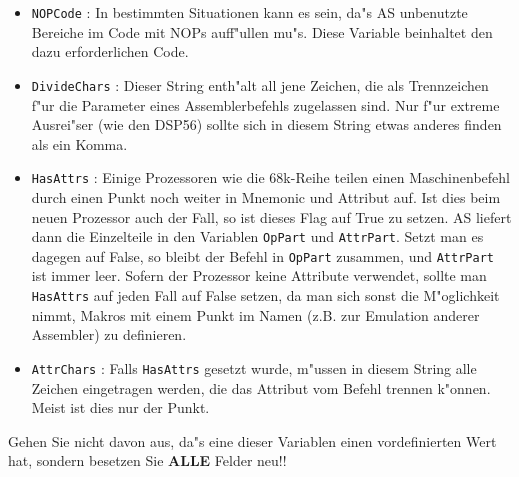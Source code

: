 \documentclass[12pt,a4paper,twoside]{report}
\newcommand{\bb}[1]{{\bf #1}}
\newcommand{\tty}[1]{{\tt #1}}
\begin{document}
{\begin{itemize}
{      diese sind f"ur Sonderzwecke (wie z.B. eine zuk"unftige Erweiterung
      um einen Linker) reserviert.  Auch wenn dieser Wert in den meisten 
      "alteren Codegeneratoren hart gesetzt wird, ist es die heute
      bevorzugte Methode, den Wert aus {\tt headids.h} per {\tt
      FindFamilyByName} zu holen.}
\item{\tty{NOPCode} : In bestimmten Situationen kann es sein, da"s AS unbenutzte
      Bereiche im Code mit NOPs auff"ullen mu"s.  Diese Variable beinhaltet
      den dazu erforderlichen Code.}
\item{\tty{DivideChars} : Dieser String enth"alt all jene Zeichen, die als
      Trennzeichen f"ur die Parameter eines Assemblerbefehls zugelassen
      sind.  Nur f"ur extreme Ausrei"ser (wie den DSP56) sollte sich in
      diesem String etwas anderes finden als ein Komma.}
\item{\tty{HasAttrs} : Einige Prozessoren wie die 68k-Reihe teilen einen
      Maschinenbefehl durch einen Punkt noch weiter in Mnemonic und
      Attribut auf.  Ist dies beim neuen Prozessor auch der Fall, so
      ist dieses Flag auf True zu setzen.  AS liefert dann die Einzelteile
      in den Variablen \tty{OpPart} und \tty{AttrPart}.  Setzt man es
      dagegen auf False, so bleibt der Befehl in \tty{OpPart} zusammen,
      und \tty{AttrPart} ist immer leer.  Sofern der Prozessor keine
      Attribute verwendet, sollte man \tty{HasAttrs} auf jeden Fall auf False
      setzen, da man sich sonst die M"oglichkeit nimmt, Makros mit einem
      Punkt im Namen (z.B. zur Emulation anderer Assembler) zu definieren.}
\item{\tty{AttrChars} : Falls \tty{HasAttrs} gesetzt wurde, m"ussen in diesem
      String alle Zeichen eingetragen werden, die das Attribut vom Befehl
      trennen k"onnen.  Meist ist dies nur der Punkt.}
\end{itemize}
Gehen Sie nicht davon aus, da"s eine dieser Variablen einen vordefinierten
Wert hat, sondern besetzen Sie \bb{ALLE} Felder neu!!

}
\end{document}
